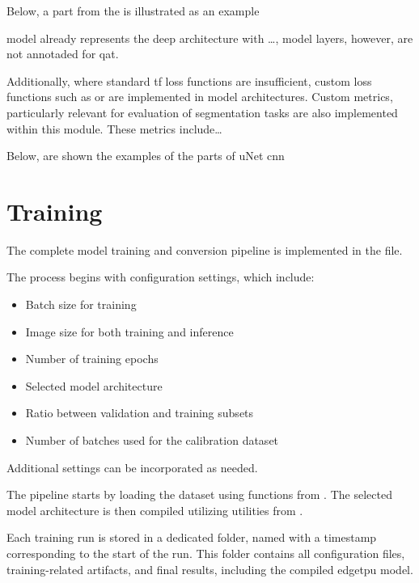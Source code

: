 {Below, a part from the  is illustrated as an example

 model already represents the deep  architecture with \dots, model layers, however, are not annotaded for \gls{qat}.


Additionally, where standard \gls{tf} loss functions are insufficient, custom loss functions such as  or  are implemented in model architectures.
Custom metrics, particularly relevant for evaluation of segmentation tasks are also implemented within this module.
These metrics include\dots
{}


Below, are shown the examples of the parts of uNet \gls{cnn}

\section{Training}
\label{sec:training}

The complete model training and conversion pipeline is implemented in the  file.

The process begins with configuration settings, which include:
\begin{itemize}
\item Batch size for training
\item Image size for both training and inference
\item Number of training epochs
\item Selected model architecture
\item Ratio between validation and training subsets
\item Number of batches used for the calibration dataset
\end{itemize}
Additional settings can be incorporated as needed.

The pipeline starts by loading the dataset using functions from .
The selected model architecture is then compiled utilizing utilities from .

Each training run is stored in a dedicated folder, named with a timestamp corresponding to the start of the run.
This folder contains all configuration files, training-related artifacts, and final results, including the compiled \gls{edgetpu} model.

}
